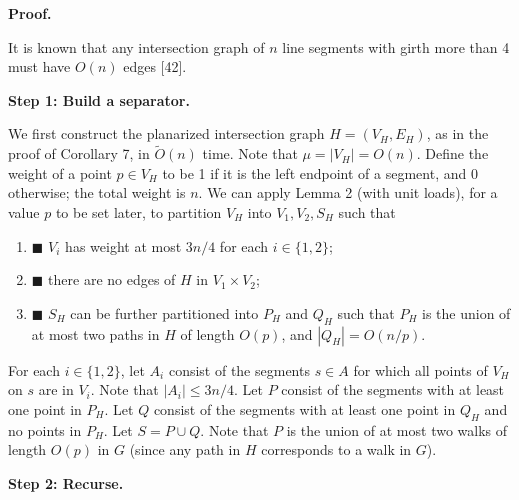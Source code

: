 \documentclass[10pt,a4paper]{article}
\begin{document}
\par\medskip\noindent\textbf{Proof.}\par
It is known that any intersection graph of $n$ line segments with girth more than 4 must have $O(n)$ edges [42].
\par
\par
\par\medskip\noindent\textbf{Step 1: Build a separator.}\par
We first construct the planarized intersection graph $H=(V_{H},E_{H})$, as in the proof of Corollary 7, in $\widetilde{O}(n)$ time. Note that $\mu=|V_{H}|=O(n)$. Define the weight of a point $p\in V_{H}$ to be 1 if it is the left endpoint of a segment, and 0 otherwise; the total weight is $n$. We can apply Lemma 2 (with unit loads), for a value $p$ to be set later, to partition $V_{H}$ into $V_{1},V_{2},S_{H}$ such that
\par
\begin{enumerate}
\item[]  $\blacksquare$ 
$V_{i}$ has weight at most $3n/4$ for each $i\in\{1,2\}$;
\par
\par
\item[]  $\blacksquare$ 
there are no edges of $H$ in $V_{1}\times V_{2}$;
\par
\par
\item[]  $\blacksquare$ 
$S_{H}$ can be further partitioned into $P_{H}$ and $Q_{H}$ such that $P_{H}$ is the union of at most two paths in $H$ of length $O(p)$, and $|Q_{H}|=O(n/p)$.
\par
\par
\end{enumerate}
For each $i\in\{1,2\}$, let $A_{i}$ consist of the segments $s\in A$ for which all points of $V_{H}$ on $s$ are in $V_{i}$. Note that $|A_{i}|\leq 3n/4$. Let $P$ consist of the segments with at least one point in $P_{H}$. Let $Q$ consist of the segments with at least one point in $Q_{H}$ and no points in $P_{H}$. Let $S=P\cup Q$. Note that $P$ is the union of at most two walks of length $O(p)$ in $G$ (since any path in $H$ corresponds to a walk in $G$).
\par
\par
\par\medskip\noindent\textbf{Step 2: Recurse.}\par
\end{document}
